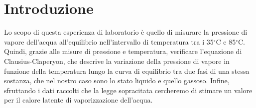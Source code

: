 \section{Introduzione}

Lo scopo di questa esperienza di laboratorio è quello di misurare la pressione
di vapore dell'acqua all'equilibrio nell'intervallo di temperatura tra i 35$^\circ$C
e 85$^\circ$C. Quindi, grazie alle misure di pressione e temperatura, verificare
l'equazione di Clausius-Claperyon, che descrive la variazione della pressione di vapore
in funzione della temperatura lungo la curva di equilibrio tra due fasi di una stessa sostanza,
che nel nostro caso sono lo stato liquido e quello gassoso.
Infine, sfruttando i dati raccolti che la legge sopracitata cercheremo di stimare un valore
per il calore latente di vaporizzazione dell'acqua.